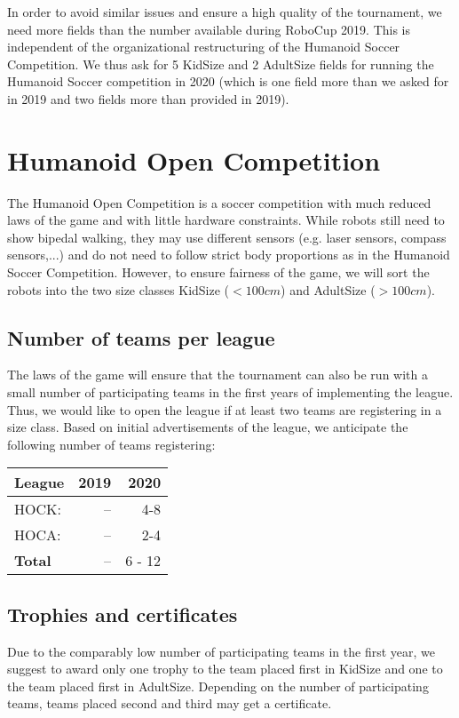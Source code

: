 \documentclass{article}
\begin{document}
In order to avoid similar issues and ensure a high quality of the tournament, we need more fields than the number available during RoboCup 2019. This is independent of the organizational restructuring of the Humanoid Soccer Competition. We thus ask for 5 KidSize and 2 AdultSize fields for running the Humanoid Soccer competition in 2020 (which is one field more than we asked for in 2019 and two fields more than provided in 2019).

\section{Humanoid Open Competition}

The Humanoid Open Competition is a soccer competition with much reduced laws of the game and with little hardware constraints. While robots still need to show bipedal walking, they may use different sensors (e.g. laser sensors, compass sensors,...) and do not need to follow strict body proportions as in the Humanoid Soccer Competition. However, to ensure fairness of the game, we will sort the robots into the two size classes KidSize ($< 100 cm$) and AdultSize ($> 100 cm$). 

\subsection{Number of teams per league}
The laws of the game will ensure that the tournament can also be run with a small number of participating teams in the first years of implementing the league. Thus, we would like to open the league if at least two teams are registering in a size class. Based on initial advertisements of the league, we anticipate the following number of teams registering:

\begin{table}[h]
  \centering
  \begin{tabular}{l | r | r}
    League & 2019 & 2020\\
    \hline
    HOCK: & -- & 4-8\\
    HOCA: & -- & 2-4\\ 
    \hline
    \textbf{Total} & -- & 6 - 12
  \end{tabular}
\end{table}

\subsection{Trophies and certificates}
Due to the comparably low number of participating teams in the first year, we suggest to award only one trophy to the team placed first in KidSize and one to the team placed first in AdultSize. Depending on the number of participating teams, teams placed second and third may get a certificate.
\end{document}
